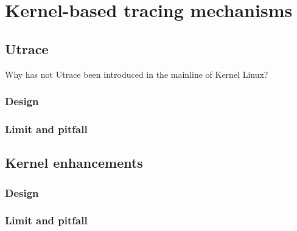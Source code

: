 \chapter{Kernel-based tracing mechanisms}

\section{Utrace}
Why has not Utrace been introduced in the mainline of Kernel Linux? 
\subsection{Design}
\subsection{Limit and pitfall}
\section{Kernel enhancements}
\subsection{Design}
\subsection{Limit and pitfall}



